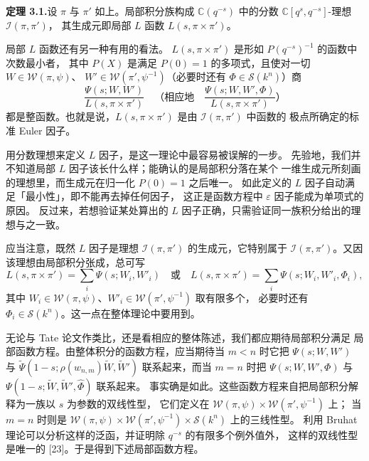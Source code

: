\textbf{定理 3.1.}\quad 设 $\pi$ 与 $\pi'$ 如上。局部积分族构成
$\mathbb{C}(q^{-s})$ 中的分数 $\mathbb{C}[q^s,q^{-s}]$-理想 $\mathcal{I}(\pi,\pi')$，
其生成元即局部 $L$ 函数 $L(s,\pi\times\pi')$。

局部 $L$ 函数还有另一种有用的看法。
$L(s,\pi\times\pi')$ 是形如 $P(q^{-s})^{-1}$ 的函数中次数最小者，
其中 $P(X)$ 是满足 $P(0)=1$ 的多项式，且使对一切 $W\in\mathcal{W}(\pi,\psi)$、
$W'\in\mathcal{W}(\pi',\psi^{-1})$（必要时还有 $\Phi\in\mathcal{S}(k^n)$）商
\[
\frac{\Psi(s;W,W')}{L(s,\pi\times\pi')}
\quad\text{（相应地}\quad
\frac{\Psi(s;W,W',\Phi)}{L(s,\pi\times\pi')}\text{）}
\]
都是整函数。也就是说，$L(s,\pi\times\pi')$ 是由 $\mathcal{I}(\pi,\pi')$ 中函数的
极点所确定的标准 Euler 因子。
\begin{annote}
用分数理想来定义 $L$ 因子，是这一理论中最容易被误解的一步。
先验地，我们并不知道局部 $L$ 因子该长什么样；能确认的是局部积分落在某个
一维生成元所刻画的理想里，而生成元在归一化 $P(0)=1$ 之后唯一。
如此定义的 $L$ 因子自动满足「最小性」，即不能再去掉任何因子，
这正是函数方程中 $\varepsilon$ 因子能成为单项式的原因。
反过来，若想验证某处算出的 $L$ 因子正确，只需验证同一族积分给出的理想与之一致。
\par\vspace{0.15em}{\raggedleft 【来源：Jacquet--Piatetski-Shapiro--Shalika, Amer.\ J.\ Math.\ 105 (1983), §3；Cogdell, ICTP Lecture Notes, §3（A）】\par}
\end{annote}

应当注意，既然 $L$ 因子是理想 $\mathcal{I}(\pi,\pi')$ 的生成元，它特别属于
$\mathcal{I}(\pi,\pi')$。又因该理想由局部积分张成，总可写
\[
L(s,\pi\times\pi')=\sum_i\Psi(s;W_i,W'_i)
\quad\text{或}\quad
L(s,\pi\times\pi')=\sum_i\Psi(s;W_i,W'_i,\Phi_i),
\]
其中 $W_i\in\mathcal{W}(\pi,\psi)$、$W'_i\in\mathcal{W}(\pi',\psi^{-1})$ 取有限多个，
必要时还有 $\Phi_i\in\mathcal{S}(k^n)$。这一点在整体理论中要用到。

无论与 Tate 论文作类比，还是看相应的整体陈述，我们都应期待局部积分满足
局部函数方程。由整体积分的函数方程，应当期待当 $m<n$ 时它把
$\Psi(s;W,W')$ 与 $\widetilde{\Psi}(1-s;\rho(w_{n,m})\widetilde{W},\widetilde{W}')$
联系起来，而当 $m=n$ 时把 $\Psi(s;W,W',\Phi)$ 与
$\Psi(1-s;\widetilde{W},\widetilde{W}',\widehat{\Phi})$ 联系起来。
事实确是如此。这些函数方程来自把局部积分解释为一族以 $s$ 为参数的双线性型，
它们定义在 $\mathcal{W}(\pi,\psi)\times\mathcal{W}(\pi',\psi^{-1})$ 上；
当 $m=n$ 时则是 $\mathcal{W}(\pi,\psi)\times\mathcal{W}(\pi',\psi^{-1})
\times\mathcal{S}(k^n)$ 上的三线性型。
利用 Bruhat 理论可以分析这样的泛函，并证明除 $q^{-s}$ 的有限多个例外值外，
这样的双线性型是唯一的 [23]。于是得到下述局部函数方程。

